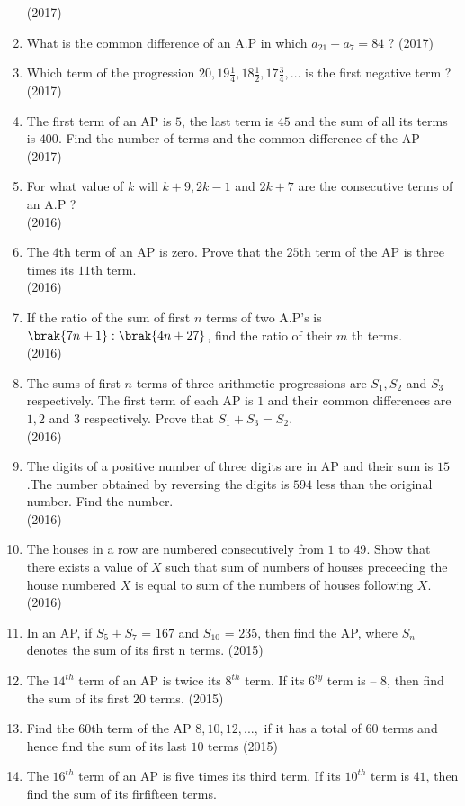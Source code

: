 \begin{enumerate}[label=\thesubsection.\arabic*,ref=\thesubsection.\theenumi,itemsep=1pt]
\hfill(2017) \item What is the common difference of an A.P in which $a_{21} - a_7 = 84$ ?
\hfill(2017) \item Which term of the progression $20,19\frac{1}{4},18\frac{1}{2},17\frac{3}{4},\dots$ is the first negative term ?
\hfill(2017) \item The first term of an AP is $5$, the last term is $45$ and the sum of all its terms is $400$. Find the number of terms and the common difference of the AP
\hfill(2017)
 \item For what value of $k$ will $k+9, 2k-1$ and $2k+7$ are the consecutive terms of an A.P ?\\
\hfill(2016) \item  The $4$th term of an AP is zero. Prove that the $25$th term of the AP is three times its $11$th term.\\
\hfill(2016) \item  If the ratio of the sum of first $n$ terms of two A.P's is $\brak{7n + 1} : \brak{4n + 27}$, find the ratio of their $m$ th terms.\\
\hfill(2016) \item The sums of first $n$ terms of three arithmetic progressions are $S_1, S_2$ and $S_3$ respectively. The first term of each AP is $1$ and their common differences are $1, 2$ and $3$ respectively. Prove that $S_1+S_3=S_2$.\\
\hfill(2016) \item The digits of a positive number of three digits are in AP and their sum is $15$.The number obtained by reversing the digits is $594$ less than the original number. Find the number.\\
\hfill(2016) \item The houses in a row are numbered consecutively from $1$ to $49$. Show that there exists a value of $X$ such that sum of numbers of houses preceeding the house numbered $X$ is equal to sum of the numbers of houses following $X$.
\hfill(2016)
 \item In an AP, if $S_5 + S_7$ = $167$ and $S_10$ = $235$, then find the AP, where $S_n$ denotes the sum of its first n terms.
\hfill(2015) \item The $14^{th}$ term of an AP is twice its $8^{th}$ term. If its $6^{ty}$ term is – $8$, then find the sum of its first $20$ terms.
\hfill(2015) \item Find the 60th term of the AP $8, 10,  12, ...,$ if it has a total of 60 terms and hence find the sum of its last $10$ terms
\hfill(2015) \item The $16^{th}$ term of an {AP} is five times its third term. If its $10^{th}$ term is $41$, then find the sum of its firfifteen terms.

\end{enumerate}
